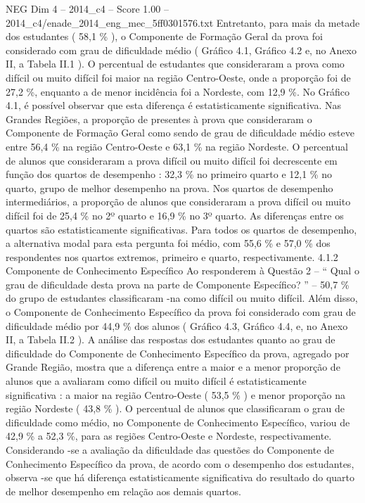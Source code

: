 \begin{textsample}{NEG Dim 4 – 2014\_c4 – Score 1.00 – 2014\_c4/enade\_2014\_eng\_mec\_5ff0301576.txt}
Entretanto, para mais da metade dos estudantes ( 58,1 \% ), o Componente de Formação Geral da prova foi considerado com grau de dificuldade médio ( Gráfico 4.1, Gráfico 4.2 e, no Anexo II, a Tabela II.1 ).
O percentual de estudantes que consideraram a prova como difícil ou muito difícil foi maior na região Centro-Oeste, onde a proporção foi de 27,2 \%, enquanto a de menor incidência foi a Nordeste, com 12,9 \%.
No Gráfico 4.1, é possível observar que esta diferença é estatisticamente significativa.
Nas Grandes Regiões, a proporção de presentes à prova que consideraram o Componente de Formação Geral como sendo de grau de dificuldade médio esteve entre 56,4 \% na região Centro-Oeste e 63,1 \% na região Nordeste.
O percentual de alunos que consideraram a prova difícil ou muito difícil foi decrescente em função dos quartos de desempenho : 32,3 \% no primeiro quarto e 12,1 \% no quarto, grupo de melhor desempenho na prova.
Nos quartos de desempenho intermediários, a proporção de alunos que consideraram a prova difícil ou muito difícil foi de 25,4 \% no 2º quarto e 16,9 \% no 3º quarto.
As diferenças entre os quartos são estatisticamente significativas.
Para todos os quartos de desempenho, a alternativa modal para esta pergunta foi médio, com 55,6 \% e 57,0 \% dos respondentes nos quartos extremos, primeiro e quarto, respectivamente. 4.1.2 Componente de Conhecimento Específico Ao responderem à Questão 2 – “ Qual o grau de dificuldade desta prova na parte de Componente Específico? ” – 50,7 \% do grupo de estudantes classificaram -na como difícil ou muito difícil.
Além disso, o Componente de Conhecimento Específico da prova foi considerado com grau de dificuldade médio por 44,9 \% dos alunos ( Gráfico 4.3, Gráfico 4.4, e, no Anexo II, a Tabela II.2 ).
A análise das respostas dos estudantes quanto ao grau de dificuldade do Componente de Conhecimento Específico da prova, agregado por Grande Região, mostra que a diferença entre a maior e a menor proporção de alunos que a avaliaram como difícil ou muito difícil é estatisticamente significativa : a maior na região Centro-Oeste ( 53,5 \% ) e menor proporção na região Nordeste ( 43,8 \% ).
O percentual de alunos que classificaram o grau de dificuldade como médio, no Componente de Conhecimento Específico, variou de 42,9 \% a 52,3 \%, para as regiões Centro-Oeste e Nordeste, respectivamente.
Considerando -se a avaliação da dificuldade das questões do Componente de Conhecimento Específico da prova, de acordo com o desempenho dos estudantes, observa -se que há diferença estatisticamente significativa do resultado do quarto de melhor desempenho em relação aos demais quartos.

\end{textsample}
